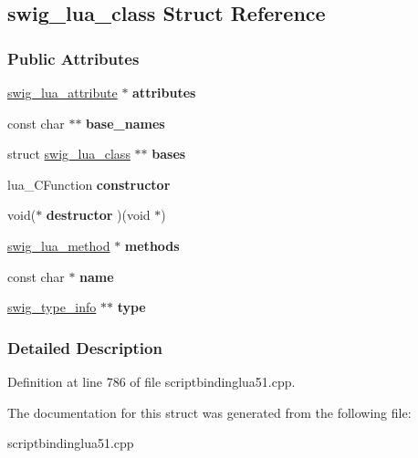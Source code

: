\hypertarget{structswig__lua__class}{
\subsection{swig\_\-lua\_\-class Struct Reference}
\label{structswig__lua__class}
}
\subsubsection*{Public Attributes}
\begin{DoxyCompactItemize}
\item 
\hypertarget{structswig__lua__class_a3061adc91d7cb1a16967927e8d4a7261}{
\hyperlink{structswig__lua__attribute}{swig\_\-lua\_\-attribute} $\ast$ {\bfseries attributes}}
\label{structswig__lua__class_a3061adc91d7cb1a16967927e8d4a7261}

\item 
\hypertarget{structswig__lua__class_a25f24829385c30c59cec92c91fceca23}{
const char $\ast$$\ast$ {\bfseries base\_\-names}}
\label{structswig__lua__class_a25f24829385c30c59cec92c91fceca23}

\item 
\hypertarget{structswig__lua__class_a468e2d019d6cff6bbe8fefc8f572420b}{
struct \hyperlink{structswig__lua__class}{swig\_\-lua\_\-class} $\ast$$\ast$ {\bfseries bases}}
\label{structswig__lua__class_a468e2d019d6cff6bbe8fefc8f572420b}

\item 
\hypertarget{structswig__lua__class_aac6eb9dc9a5e0b5f2c9d31a97ce0282e}{
lua\_\-CFunction {\bfseries constructor}}
\label{structswig__lua__class_aac6eb9dc9a5e0b5f2c9d31a97ce0282e}

\item 
\hypertarget{structswig__lua__class_ae7029d37913cf77df8f5c473c5cb43fe}{
void($\ast$ {\bfseries destructor} )(void $\ast$)}
\label{structswig__lua__class_ae7029d37913cf77df8f5c473c5cb43fe}

\item 
\hypertarget{structswig__lua__class_ae0d9f30a8114623b1185b5907fc60719}{
\hyperlink{structswig__lua__method}{swig\_\-lua\_\-method} $\ast$ {\bfseries methods}}
\label{structswig__lua__class_ae0d9f30a8114623b1185b5907fc60719}

\item 
\hypertarget{structswig__lua__class_abefc5d1a37e06e1c9305d3456a59f2d0}{
const char $\ast$ {\bfseries name}}
\label{structswig__lua__class_abefc5d1a37e06e1c9305d3456a59f2d0}

\item 
\hypertarget{structswig__lua__class_a139831b0d9b661d6e64c1f902d63142d}{
\hyperlink{structswig__type__info}{swig\_\-type\_\-info} $\ast$$\ast$ {\bfseries type}}
\label{structswig__lua__class_a139831b0d9b661d6e64c1f902d63142d}

\end{DoxyCompactItemize}


\subsubsection{Detailed Description}


Definition at line 786 of file scriptbindinglua51.cpp.



The documentation for this struct was generated from the following file:\begin{DoxyCompactItemize}
\item 
scriptbindinglua51.cpp\end{DoxyCompactItemize}
